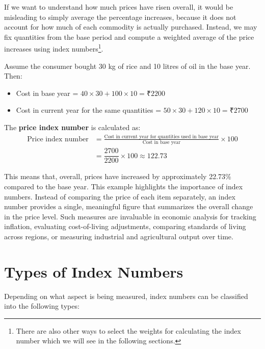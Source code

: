 \documentclass[twoside]{book}
\begin{document}
If we want to understand how much prices have risen overall, it would be misleading to simply average the percentage increases, because it does not account for how much of each commodity is actually purchased. Instead, we may fix quantities from the base period and compute a weighted average of the price increases using index numbers\footnote{There are also other ways to select the weights for calculating the index number which we will see in the following sections.}.

Assume the consumer bought 30 kg of rice and 10 litres of oil in the base year. Then:

\begin{itemize}
    \item Cost in base year = \( 40 \times 30 + 100 \times 10 = ₹2200 \)
    \item Cost in current year for the same quantities = \( 50 \times 30 + 120 \times 10 = ₹2700 \)
\end{itemize}

The \textbf{price index number} is calculated as:
\begin{align*}
\text{Price index number} &= \frac{\text{Cost in current year for quantities used in base year}}{\text{Cost in base year}} \times 100 \\
&= \dfrac{2700}{2200} \times 100 \approx 122.73
\end{align*}

This means that, overall, prices have increased by approximately 22.73\% compared to the base year. This example highlights the importance of index numbers. Instead of comparing the price of each item separately, an index number provides a single, meaningful figure that summarizes the overall change in the price level. Such measures are invaluable in economic analysis for tracking inflation, evaluating cost-of-living adjustments, comparing standards of living across regions, or measuring industrial and agricultural output over time.


\section{Types of Index Numbers}

Depending on what aspect is being measured, index numbers can be classified into the following types:
\end{document}

